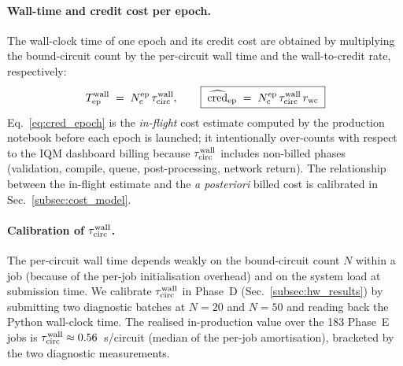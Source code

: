 \paragraph{Wall-time and credit cost per epoch.}
The wall-clock time of one epoch and its credit cost are obtained by
multiplying the bound-circuit count by the per-circuit wall time and the
wall-to-credit rate, respectively:
\begin{equation}
T_{\rm ep}^{\rm wall} \;=\; N_{\rm c}^{\rm ep}\,\tau_{\rm circ}^{\rm wall},
\qquad
\boxed{\;
\widehat{\mathrm{cred}}_{\rm ep}
\;=\; N_{\rm c}^{\rm ep}\,\tau_{\rm circ}^{\rm wall}\,r_{\rm wc} \;}
\label{eq:cred_epoch}
\end{equation}
Eq.~\eqref{eq:cred_epoch} is the \emph{in-flight} cost estimate computed by the
production notebook before each epoch is launched; it intentionally over-counts
with respect to the IQM dashboard billing because $\tau_{\rm circ}^{\rm wall}$
includes non-billed phases (validation, compile, queue, post-processing,
network return). The relationship between the in-flight estimate and the
\emph{a posteriori} billed cost is calibrated in Sec.~\ref{subsec:cost_model}.

\paragraph{Calibration of $\tau_{\rm circ}^{\rm wall}$.}
The per-circuit wall time depends weakly on the bound-circuit count $N$ within
a job (because of the per-job initialisation overhead) and on the system load
at submission time. We calibrate $\tau_{\rm circ}^{\rm wall}$ in Phase~D
(Sec.~\ref{subsec:hw_results}) by submitting two diagnostic batches at
$N=20$ and $N=50$ and reading back the Python wall-clock time. The realised
in-production value over the 183 Phase~E jobs is
$\tau_{\rm circ}^{\rm wall}\approx 0.56$~s/circuit (median of the per-job
amortisation), bracketed by the two diagnostic measurements.

